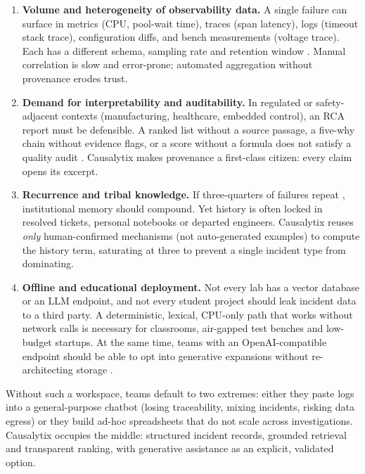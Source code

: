\documentclass[12pt,a4paper,oneside]{report}
\begin{document}
\begin{enumerate}[leftmargin=1.6em]
\item \textbf{Volume and heterogeneity of observability data.} A single failure can surface in metrics (CPU, pool-wait time), traces (span latency), logs (timeout stack trace), configuration diffs, and bench measurements (voltage trace). Each has a different schema, sampling rate and retention window \cite{soldani2022anomaly,notaro2021ahead}. Manual correlation is slow and error-prone; automated aggregation without provenance erodes trust.

\item \textbf{Demand for interpretability and auditability.} In regulated or safety-adjacent contexts (manufacturing, healthcare, embedded control), an RCA report must be defensible. A ranked list without a source passage, a five-why chain without evidence flags, or a score without a formula does not satisfy a quality audit \cite{ciecinska2023identification,doggett2005root,card2017problem}. Causalytix makes provenance a first-class citizen: every claim opens its excerpt.

\item \textbf{Recurrence and tribal knowledge.} If three-quarters of failures repeat \cite{wang2024comprehensive}, institutional memory should compound. Yet history is often locked in resolved tickets, personal notebooks or departed engineers. Causalytix reuses \textit{only} human-confirmed mechanisms (not auto-generated examples) to compute the history term, saturating at three to prevent a single incident type from dominating.

\item \textbf{Offline and educational deployment.} Not every lab has a vector database or an LLM endpoint, and not every student project should leak incident data to a third party. A deterministic, lexical, CPU-only path that works without network calls is necessary for classrooms, air-gapped test benches and low-budget startups. At the same time, teams with an OpenAI-compatible endpoint should be able to opt into generative expansions without re-architecting storage \cite{lewis2020rag,remil2024aiops}.
\end{enumerate}

Without such a workspace, teams default to two extremes: either they paste logs into a general-purpose chatbot (losing traceability, mixing incidents, risking data egress) or they build ad-hoc spreadsheets that do not scale across investigations. Causalytix occupies the middle: structured incident records, grounded retrieval and transparent ranking, with generative assistance as an explicit, validated option.
\end{document}
